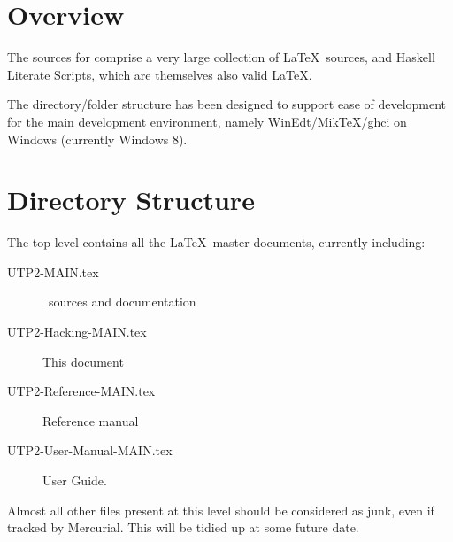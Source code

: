 \section{Overview}

The sources  for  comprise a very large collection of \LaTeX\ sources, and Haskell Literate Scripts,
which are themselves also valid \LaTeX.

The directory/folder structure has been designed to support ease of
development for the main development environment, namely WinEdt/MikTeX/ghci
on Windows (currently Windows 8).

\section{Directory Structure}

The top-level contains all the \LaTeX\ master documents,
currently including:
\begin{description}
  \item[UTP2-MAIN.tex] \ sources and documentation
  \item[UTP2-Hacking-MAIN.tex] This document
  \item[UTP2-Reference-MAIN.tex] Reference manual
  \item[UTP2-User-Manual-MAIN.tex] User Guide.
\end{description}
Almost all other files present at this level should be considered
as junk, even if tracked by Mercurial. This will be tidied up at some
future date.

